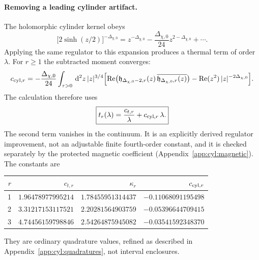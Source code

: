 \documentclass[11pt,a4paper]{article}
\numberwithin{equation}{section}
\newcommand{\dd}{\,\mathrm d}
\begin{document}
\paragraph{Removing a leading cylinder artifact.} The holomorphic cylinder kernel obeys
\begin{equation}
 \bigl[2\sinh(z/2)\bigr]^{-\Delta_{\chi,0}}=z^{-\Delta_{\chi,0}}-\frac{\Delta_{\chi,0}}{24}z^{2-\Delta_{\chi,0}}+\cdots.
\end{equation}
Applying the same regulator to this expansion produces a thermal term of order $\lambda$. For $r\ge1$ the subtracted
moment converges:
\begin{equation}
 c_{{\rm cyl},r}=-\frac{\Delta_{\chi,0}}{24}\int_{\tau>0}\dd^2z\,|z|^{3/4}\Bigl[{\rm Re}\bigl(\mathfrak
 h_{\Delta_{\chi,0}-2,r}(z)\,\overline{\mathfrak h_{\Delta_{\chi,0},r}(z)}\bigr)-{\rm Re}(z^2)\,|z|^{-2\Delta_{\chi,0}}\Bigr].
\end{equation}
The calculation therefore uses
\begin{equation}
 \boxed{t_r(\lambda)=\frac{c_{t,r}}{\lambda}+c_{{\rm cyl},r}\,\lambda.}
 \label{eq:cyl:tfinal}
\end{equation}
The second term vanishes in the continuum. It is an explicitly derived regulator improvement, not an adjustable finite
fourth-order constant, and it is checked separately by the protected magnetic coefficient
(Appendix~\ref{app:cyl:magnetic}). The constants are
\begin{center}\small
\begin{tabular}{@{}rrrr@{}}
\toprule
$r$ & $c_{t,r}$ & $\kappa_r$ & $c_{{\rm cyl},r}$\\
\midrule
1 & $1.96478977995214$ & $1.78455951314437$ & $-0.11068091195498$\\
2 & $3.31217153117521$ & $2.20281564903759$ & $-0.05396644709415$\\
3 & $4.74456159798846$ & $2.54264875945082$ & $-0.03541592348370$\\
\bottomrule
\end{tabular}
\end{center}
They are ordinary quadrature values, refined as described in Appendix~\ref{app:cyl:quadratures}, not interval enclosures.
\end{document}
